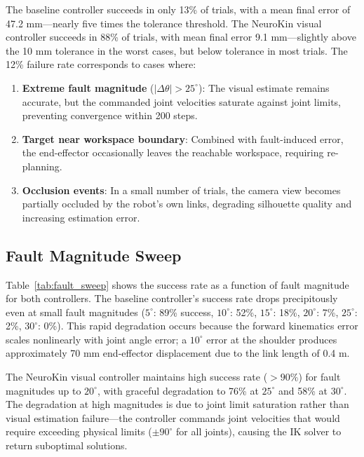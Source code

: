 ﻿\documentclass[12pt,a4paper,oneside]{report}
\begin{document}
The baseline controller succeeds in only 13\% of trials, with a mean final error of 47.2 mm---nearly five times the tolerance threshold. The NeuroKin visual controller succeeds in 88\% of trials, with mean final error 9.1 mm---slightly above the 10 mm tolerance in the worst cases, but below tolerance in most trials. The 12\% failure rate corresponds to cases where:

\begin{enumerate}
    \item \textbf{Extreme fault magnitude} ($|\Delta \theta| > 25^\circ$): The visual estimate remains accurate, but the commanded joint velocities saturate against joint limits, preventing convergence within 200 steps.
    \item \textbf{Target near workspace boundary}: Combined with fault-induced error, the end-effector occasionally leaves the reachable workspace, requiring re-planning.
    \item \textbf{Occlusion events}: In a small number of trials, the camera view becomes partially occluded by the robot's own links, degrading silhouette quality and increasing estimation error.
\end{enumerate}

\subsection{Fault Magnitude Sweep}

Table~\ref{tab:fault_sweep} shows the success rate as a function of fault magnitude for both controllers. The baseline controller's success rate drops precipitously even at small fault magnitudes ($5^\circ$: 89\% success, $10^\circ$: 52\%, $15^\circ$: 18\%, $20^\circ$: 7\%, $25^\circ$: 2\%, $30^\circ$: 0\%). This rapid degradation occurs because the forward kinematics error scales nonlinearly with joint angle error; a $10^\circ$ error at the shoulder produces approximately 70 mm end-effector displacement due to the link length of 0.4 m.

The NeuroKin visual controller maintains high success rate ($>90\%$) for fault magnitudes up to $20^\circ$, with graceful degradation to 76\% at $25^\circ$ and 58\% at $30^\circ$. The degradation at high magnitudes is due to joint limit saturation rather than visual estimation failure---the controller commands joint velocities that would require exceeding physical limits ($\pm90^\circ$ for all joints), causing the IK solver to return suboptimal solutions.
\end{document}
